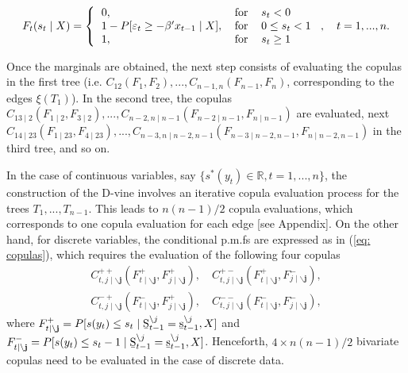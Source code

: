 \documentclass[harvard,11pt]{article}
\begin{document}
\begin{equation}\label{eq: BernoulliCDF2}
F_t(s_t\mid X)=\left\{ 
\begin{tabular}{lll}
$0,$ &$\text{for}$& $s_t< 0$ \\ 
$1-P[\varepsilon_t\geq  -\beta' x_{t-1}\mid X],$ &$\text{for}$ &$0\leq s_t< 1$ \\
$1,$& $\text{for}$& $s_t\geq 1$
\end{tabular}%
\right.,\quad t=1,...,n.
\end{equation} 
\begin{sloppypar}
Once the marginals are obtained, the next step consists of evaluating the copulas in the first tree (i.e. $C_{12}(F_1,F_2),...,C_{n-1,n}(F_{n-1},F_n)$, corresponding to the edges $\xi(T_1)$). In the second tree, the copulas $C_{13\mid 2}(F_{1\mid 2},F_{3\mid 2}),...,C_{n-2,n \mid n-1}(F_{n-2\mid n-1},F_{n\mid n-1})$ are evaluated, next $C_{14\mid 23}(F_{1\mid 23},F_{4\mid 23}),...,C_{n-3,n\mid n-2,n-1}(F_{n-3\mid n-2,n-1},F_{n\mid n-2,n-1})$ in the third tree, and so on. 
\end{sloppypar}

In the case of continuous variables, say $\{s^*(y_t)\in \mathbb{R},t=1,...,n\}$, the construction of the D-vine involves an iterative copula evaluation process for the trees $T_1,...,T_{n-1}$. This leads to $n(n-1)/2$ copula evaluations, which corresponds to one copula evaluation for each edge [see Appendix]. On the other hand, for discrete variables, the conditional p.m.fs are expressed as in (\ref{eq: copulas}), which requires the evaluation of the following four copulas
\begingroup
\allowdisplaybreaks
\begin{align*}
C_{t,j\mid \mathbf{\backslash j}}^{++}(F_{t\mid \mathbf{\backslash j}}^+,F_{j\mid \mathbf{\backslash j}}^+),\quad C_{t,j\mid \mathbf{\backslash j}}^{+-}(F_{t\mid \mathbf{\backslash j}}^+,F_{j\mid \mathbf{\backslash j}}^-),\\
C_{t,j\mid \mathbf{\backslash j}}^{-+}(F_{t\mid \mathbf{\backslash j}}^-,F_{j\mid \mathbf{\backslash j}}^+),\quad C_{t,j\mid \mathbf{\backslash j}}^{--}(F_{t\mid \mathbf{\backslash j}}^-,F_{j\mid \mathbf{\backslash j}}^-),
\end{align*}
\endgroup
where $F_{t\mid \mathbf{\backslash j}}^+=P[s(y_t)\leq s_t \mid\text{\b{S}}_{t-1}^{\backslash j}=\text{\b{s}}_{t-1}^{\backslash j},X]$ and $F_{t\mid \mathbf{\backslash j}}^-=P[s(y_t)\leq s_t-1 \mid\text{\b{S}}_{t-1}^{\backslash j}=\text{\b{s}}_{t-1}^{\backslash j},X]$. Henceforth, $4\times n(n-1)/2$ bivariate copulas need to be evaluated in the case of discrete data. 
\end{document}

